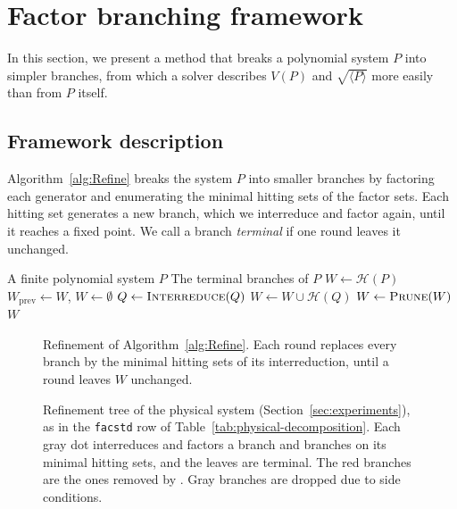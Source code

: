 \section{Factor branching framework}
\label{sec:method}

In this section, we present a method that breaks a polynomial system $P$ into
simpler branches, from which a solver describes $V(P)$ and $\sqrt{\langle P
\rangle}$ more easily than from $P$ itself.

\subsection{Framework description}
\label{subsec:branching-framework}
Algorithm~\ref{alg:Refine} breaks the system $P$ into smaller
branches by factoring each generator and enumerating the minimal
hitting sets of the factor sets. Each hitting set generates a new
branch, which we interreduce and factor again, until it reaches a
fixed point. We call a branch \emph{terminal} if one round leaves it unchanged.

\begin{algorithm}[htbp]
  \caption{Refinement}
  \label{alg:Refine}
  \begin{algorithmic}[1]
    \Require A finite polynomial system $P$
    \Ensure The terminal branches of $P$
    \State $W\gets\mathcal H(P)$
    \Repeat
    \State $W_{\mathrm{prev}}\gets W$, \quad $W\gets\emptyset$
    \State $Q\gets\Call{Interreduce}{Q}$
    \State $W\gets W\cup\mathcal H(Q)$
    \EndFor
    \State $W\gets\Call{Prune}{W}$ 
    \State \Return $W$
  \end{algorithmic}
\end{algorithm}

\begin{figure}[pos=htbp]
  \centering
  \resizebox{0.62\textwidth}{!}{}
  \caption{Refinement of Algorithm~\ref{alg:Refine}. Each round replaces every
    branch by the minimal hitting sets of its interreduction, until a round
  leaves $W$ unchanged.}
  \label{fig:refine_flowchart}
\end{figure}

\begin{figure}[pos=htbp]
  \centering
  \resizebox{0.55\textwidth}{!}{}
  \caption{Refinement tree of the physical system
    (Section~\ref{sec:experiments}), as in the \texttt{facstd} row of
    Table~\ref{tab:physical-decomposition}. Each gray dot interreduces and
    factors a branch and branches on its minimal hitting sets, and the leaves
    are terminal. The red branches are the ones removed by .
    Gray branches are dropped due to side conditions.}
  \label{fig:refine_tree}
\end{figure}

